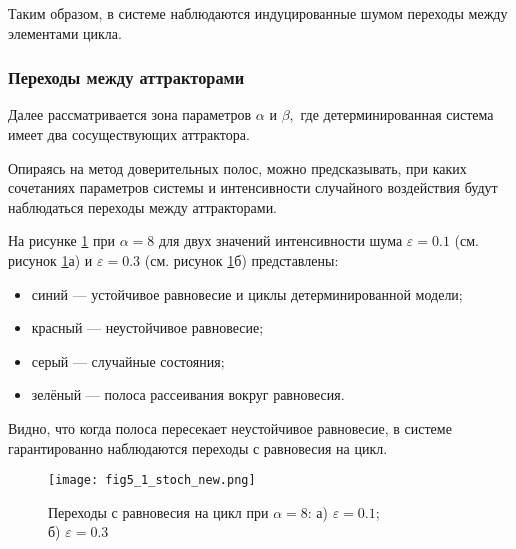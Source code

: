 \documentclass[a4paper, 14pt]{extreport}
\numberwithin{equation}{section}
\numberwithin{figure}{section}
\numberwithin{table}{section}
\begin{document}
                Таким образом, в системе наблюдаются индуцированные шумом переходы между элементами цикла.

			\subsubsection{Переходы между аттракторами}
			\label{stoch_noise_jumps}
            	Далее рассматривается зона параметров $ \alpha $ и $ \beta $,~где детерминированная система имеет два сосуществующих аттрактора.
            	
            	Опираясь на метод доверительных полос, можно предсказывать, при каких сочетаниях параметров системы и интенсивности случайного воздействия будут наблюдаться переходы между аттракторами.
				
                На рисунке \ref{fig5_1_stoch} при $ \alpha = 8 $ для двух значений интенсивности шума $ \varepsilon = 0.1 $ (см. рисунок \ref{fig5_1_stoch}а) и $ \varepsilon = 0.3 $ (см. рисунок \ref{fig5_1_stoch}б) представлены:
                \begin{itemize}
                	\item синий --- устойчивое равновесие и циклы детерминированной модели;
                    \item красный --- неустойчивое равновесие;
                    \item серый --- случайные состояния;
                    \item зелёный --- полоса рассеивания вокруг равновесия.
                \end{itemize}

                Видно, что когда полоса пересекает неустойчивое равновесие, в системе гарантированно наблюдаются переходы с равновесия на цикл.
				\begin{figure}[h!]
					\begin{center}
						\texttt{[image: fig5\_1\_stoch\_new.png]}
					\end{center}
					\caption{Переходы с равновесия на цикл при $ \alpha = 8 $: а) $ \varepsilon = 0.1 $; \\ б) $ \varepsilon = 0.3 $}
					\label{fig5_1_stoch}		
				\end{figure} %
\end{document}
